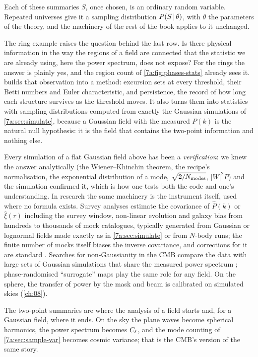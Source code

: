 Each of these summaries $S$, once chosen, is an ordinary random variable.
Repeated universes give it a sampling distribution $P(S\,\vert\,\theta)$, with
$\theta$ the parameters of the theory, and the machinery of the rest of the book
applies to it unchanged.

The ring example raises the question behind the last row. Is there physical
information in the way the regions of a field are connected that the statistic
we are already using, here the power spectrum, does not expose? For the rings the
answer is plainly yes, and the region count of \cref{7a:fig:phases-stats}
already sees it.  builds that observation into a method: excursion sets at every threshold, their Betti numbers and Euler
characteristic, and persistence, the record of how long each structure survives as
the threshold moves. It also turns them into statistics with sampling
distributions computed from exactly the Gaussian simulations of
\cref{7a:sec:simulate}, because a Gaussian field with the measured $P(k)$ is the
natural null hypothesis: it is the field that contains the two-point information
and nothing else.

\begin{inpractice}
Every simulation of a flat Gaussian field above has been a \emph{verification}: we knew the answer
analytically (the Wiener--Khinchin theorem, the recipe's normalisation, the
exponential distribution of a mode, $\sqrt{2/N_{\rm modes}}$, $|W|^2P$) and the
simulation confirmed it, which is how one tests both the code and one's
understanding. In research the same machinery is the instrument itself, used where
no formula exists. Survey analyses estimate the covariance of $\hat P(k)$ or
$\hat\xi(r)$ including the survey window, non-linear evolution and galaxy bias from
hundreds to thousands of mock catalogues, typically generated from Gaussian or
lognormal fields made exactly as in \cref{7a:sec:simulate} or from $N$-body runs; the
finite number of mocks itself biases the inverse covariance, and corrections for
it are standard \cite{Hartlap2007,Taylor2013}. Searches for non-Gaussianity in the
CMB compare the data with large sets of Gaussian simulations that share the
measured power spectrum \cite{Planck2018IX}; phase-randomised ``surrogate'' maps
play the same role for any field. On the sphere, the transfer of power by the
mask and beam is calibrated on simulated skies (\cref{ch:08}).
\end{inpractice}

The two-point summaries are where the analysis of a field starts and, for a
Gaussian field, where it ends. On the sky the plane waves become spherical
harmonics, the power spectrum becomes $C_\ell$, and the mode counting of
\cref{7a:sec:sample-var} becomes cosmic variance; that is the CMB's version of
the same story.

